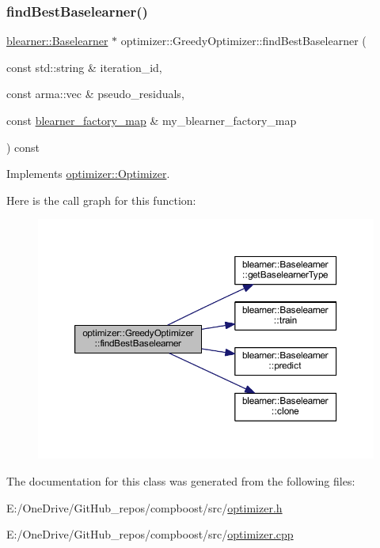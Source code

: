 \subsubsection{\texorpdfstring{find\+Best\+Baselearner()}{findBestBaselearner()}}
{\footnotesize\ttfamily \mbox{\hyperlink{classblearner_1_1_baselearner}{blearner\+::\+Baselearner}} $\ast$ optimizer\+::\+Greedy\+Optimizer\+::find\+Best\+Baselearner (\begin{DoxyParamCaption}\item[{const std\+::string \&}]{iteration\+\_\+id,  }\item[{const arma\+::vec \&}]{pseudo\+\_\+residuals,  }\item[{const \mbox{\hyperlink{baselearner__factory__list_8h_a058570e00ae11b882cfed36eb40be025}{blearner\+\_\+factory\+\_\+map}} \&}]{my\+\_\+blearner\+\_\+factory\+\_\+map }\end{DoxyParamCaption}) const\hspace{0.3cm}{\ttfamily [virtual]}}



Implements \mbox{\hyperlink{classoptimizer_1_1_optimizer_a134c7b34ed868231fbab53e9ebfa8fd8}{optimizer\+::\+Optimizer}}.

Here is the call graph for this function\+:\nopagebreak
\begin{figure}[H]
\begin{center}
\leavevmode
\includegraphics[width=350pt]{classoptimizer_1_1_greedy_optimizer_adc36d8a0082dc065fc1340869d36069d_cgraph}
\end{center}
\end{figure}


The documentation for this class was generated from the following files\+:\begin{DoxyCompactItemize}
\item 
E\+:/\+One\+Drive/\+Git\+Hub\+\_\+repos/compboost/src/\mbox{\hyperlink{optimizer_8h}{optimizer.\+h}}\item 
E\+:/\+One\+Drive/\+Git\+Hub\+\_\+repos/compboost/src/\mbox{\hyperlink{optimizer_8cpp}{optimizer.\+cpp}}\end{DoxyCompactItemize}
